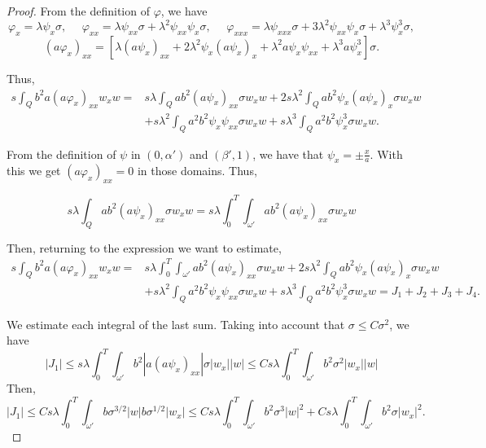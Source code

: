 \documentclass[10pt,a4paper]{amsart}
\begin{document}
\begin{proof}
    From the definition of $\varphi$, we have
    $$\varphi_x=\lambda \psi_x \sigma, \ \ \ \ \ \ \varphi_{xx}=\lambda \psi_{xx}\sigma +\lambda^2\psi_{xx}\psi_x \sigma, \ \ \ \ \ \ \varphi_{xxx}=\lambda \psi_{xxx}\sigma +3\lambda^2 \psi_{xx}\psi_x \sigma+\lambda^3\psi_x^3\sigma,$$
    $$ (a\varphi_x)_{xx}=\left[ \lambda (a\psi_x)_{xx}+2\lambda^2 \psi_x (a\psi_x)_x+\lambda^2a\psi_x\psi_{xx}+\lambda^3 a\psi_x^3   \right]\sigma.$$
    
    Thus, 
	\begin{align*}
		s\int_Q b^2 a (a \varphi_x)_{xx} w_x w=&s\lambda\int_Q ab^2 (a\psi_x)_{xx} \sigma w_x w+2s\lambda^2 \int_Q ab^2 \psi_x (a\psi_x)_x \sigma w_x w\\
		&+s\lambda^2\int_Q a^2b^2\psi_x\psi_{xx} \sigma w_x w
		+s\lambda^3\int_Q a^2b^2\psi_x^3 \sigma w_x w.
	\end{align*}
    
	From the definition of $\psi$ in $(0,\alpha')$ and $(\beta',1)$, we have that $\psi_x=\pm\frac{x}{a}$. With this we get $(a \varphi_x)_{xx}=0$  in those domains. Thus,
		
	$$s\lambda\int_Q ab^2 (a\psi_x)_{xx} \sigma w_x w=s\lambda\int_0^T\int_{\omega'} ab^2 (a\psi_x)_{xx} \sigma w_x w $$

	Then, returning to the expression we want to estimate, 
	\begin{align*}
		s\int_Q b^2 a (a \varphi_x)_{xx} w_x w=&s\lambda\int_0^T\int_{\omega'} ab^2 (a\psi_x)_{xx} \sigma w_x w +2s\lambda^2 \int_Q ab^2 \psi_x (a\psi_x)_x \sigma w_x w\\
		&+s\lambda^2\int_Q a^2b^2\psi_x\psi_{xx} \sigma w_x w
		+s\lambda^3\int_Q a^2b^2\psi_x^3 \sigma w_x w
		=J_1+J_2+J_3+J_4.
	\end{align*}
    
    We estimate each integral of the last sum. Taking into account that $\sigma\leq C\sigma^2$, we have
    $$\left|J_1 \right|\leq s\lambda\int_0^T\int_{\omega'} b^2 |a(a\psi_x)_{xx}| \sigma |w_x| |w|\leq Cs\lambda\int_0^T\int_{\omega'} b^2  \sigma^2 |w_x| |w|$$
    Then,
    $$
    \left|J_1 \right|\leq Cs\lambda\int_0^T\int_{\omega'} b \sigma^{3/2}|w| b\sigma^{1/2} |w_x| \leq Cs\lambda\int_0^T\int_{\omega'}b^2 \sigma^3|w|^2 + Cs\lambda\int_0^T\int_{\omega'}b^2 \sigma|w_x|^2.
    $$
	

\end{proof}
\end{document}
